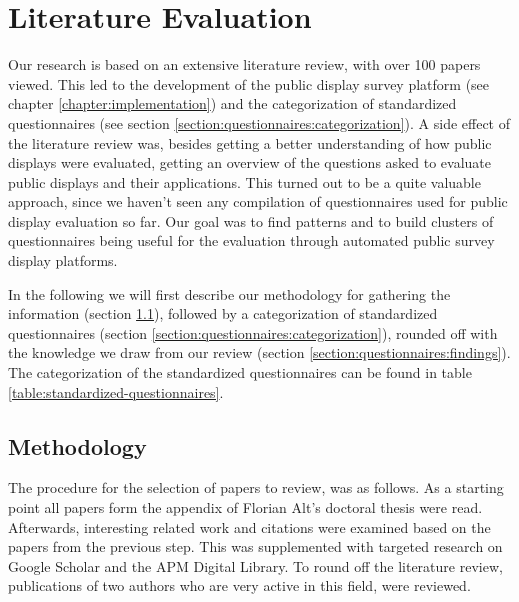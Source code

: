 \section{Literature Evaluation}
\label{chapter:literature-evaluation}

	Our research is based on an extensive literature review, with over 100 papers viewed. This led to the development of the public display survey platform (see chapter \ref{chapter:implementation}) and the categorization of standardized questionnaires (see section \ref{section:questionnaires:categorization}). A side effect of the literature review was, besides getting a better understanding of how public displays were evaluated, getting an overview of the questions asked to evaluate public displays and their applications. This turned out to be a quite valuable approach, since we haven't seen any compilation of questionnaires used for public display evaluation so far. Our goal was to find patterns and to build clusters of questionnaires being useful for the evaluation through automated public survey display platforms.

	In the following we will first describe our methodology for gathering the information (section \ref{section:questionnaires:methodology}), followed by a categorization of standardized questionnaires (section \ref{section:questionnaires:categorization}), rounded off with the knowledge we draw from our review (section \ref{section:questionnaires:findings}). The categorization of the standardized questionnaires can be found in table \ref{table:standardized-questionnaires}.



\subsection{Methodology}
\label{section:questionnaires:methodology}

	The procedure for the selection of papers to review, was as follows. As a starting point all papers form the appendix of Florian Alt's doctoral thesis \cite{alt2013thesis} were read. Afterwards, interesting related work and citations were examined based on the papers from the previous step. This was supplemented with targeted research on Google Scholar and the APM Digital Library. To round off the literature review, publications of two authors who are very active in this field, were reviewed. 

